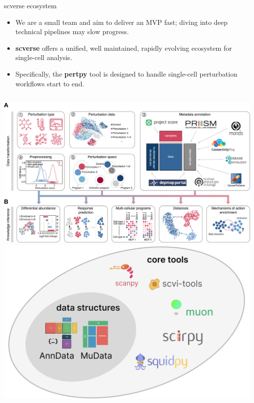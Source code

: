 \documentclass[handout]{beamer}
\begin{document}
\begin{frame}{scverse ecosystem}
    \begin{itemize}
        \item We are a small team and aim to deliver an MVP fast; diving into deep technical pipelines may slow progress.
        \item \textbf{scverse} offers a unified, well maintained, rapidly evolving ecosystem for single-cell analysis.
        \item Specifically, the \textbf{pertpy} tool is designed to handle single-cell perturbation workflows start to end.
    \end{itemize}
    \vspace{1em}
    \begin{columns}
        \centering
        \includegraphics[width=0.8\linewidth]{pertpy.png}
        \centering
        \includegraphics[width=0.8\linewidth]{scverse.jpg}
    \end{columns}
\end{frame}
\end{document}
